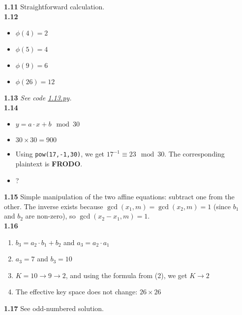 \textbf{1.11} Straightforward calculation. \\

\textbf{1.12}
\begin{itemize}
    \item $\phi(4) = 2$
    \item $\phi(5) = 4$
    \item $\phi(9) = 6$
    \item $\phi(26) = 12$
\end{itemize}

\textbf{1.13} \textit{See code \href{https://github.com/Ahpatsum15/Understanding-cryptography-solution-handbook-even-numbered/blob/main/chapter%201/1.13.py}{1.13.py}.} \\

\textbf{1.14}
\begin{itemize}
    \item $y = a \cdot x + b \mod 30$
    \item $30 \times 30 = 900$
    \item Using \texttt{pow(17,-1,30)}, we get $17^{-1} \equiv 23 \mod 30$. The corresponding plaintext is \textbf{FRODO}.
    \item ?
\end{itemize}

\textbf{1.15} Simple manipulation of the two affine equations: subtract one from the other. The inverse exists because $\gcd(x_1, m) = \gcd(x_2, m) = 1$ (since $b_1$ and $b_2$ are non-zero), so $\gcd(x_2 - x_1, m) = 1$. \\

\textbf{1.16}
\begin{enumerate}
    \item $b_3 = a_2 \cdot b_1 + b_2$ and $a_3 = a_2 \cdot a_1$
    \item $a_3 = 7$ and $b_3 = 10$
    \item $K = 10 \rightarrow 9 \rightarrow 2$, and using the formula from (2), we get $K \rightarrow 2$
    \item The effective key space does not change: $26 \times 26$
\end{enumerate}

\textbf{1.17} See odd-numbered solution. \\



